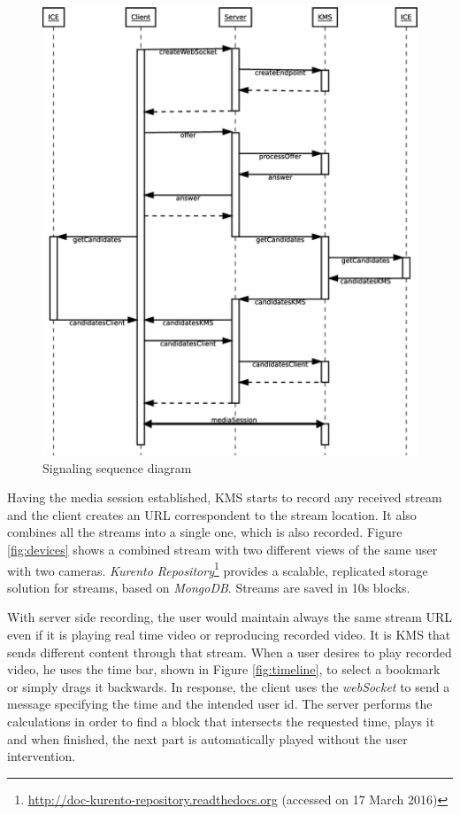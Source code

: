 \documentclass[10pt,conference]{IEEEtran}
\begin{document}
\begin{figure}
    \centering
    \includegraphics[width=\linewidth]{figures/signaling}
    \caption{Signaling sequence diagram}
    \label{fig:signaling2}
\end{figure} 

Having the media session established, \gls{KMS} starts to record any received stream and the client creates an \gls{URL} correspondent to the stream location.
It also combines all the streams into a single one, which is also recorded.
Figure \ref{fig:devices} shows a combined stream with two different views of the same user with two cameras.
\emph{Kurento Repository}\footnote{\url{http://doc-kurento-repository.readthedocs.org} (accessed on 17 March 2016)} provides a scalable, replicated storage solution for streams, based on \emph{MongoDB}.
Streams are saved in 10s blocks.

With server side recording, the user would maintain always the same stream \gls{URL} even if it is playing real time video or reproducing recorded video. 
It is \gls{KMS} that sends different content through that stream.
When a user desires to play recorded video, he uses the time bar, shown in Figure \ref{fig:timeline}, to select a bookmark or simply drags it backwards.
In response, the client uses the \emph{webSocket} to send a message specifying the time and the intended user id.
The server performs the calculations in order to find a block that intersects the requested time, plays it and when finished, the next part is automatically played without the user intervention.
\end{document}
